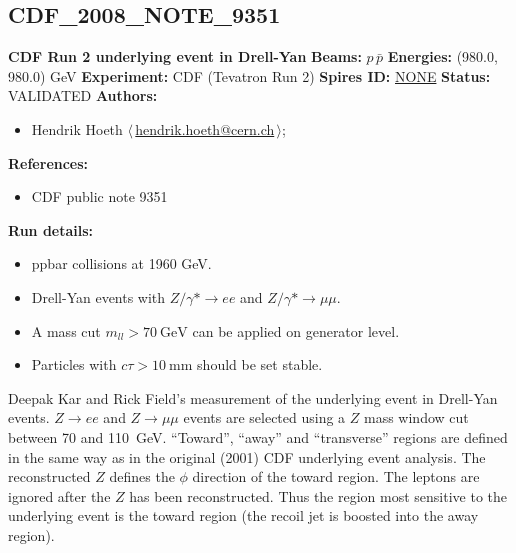 \subsection{CDF\_2008\_NOTE\_9351}
\textbf{CDF Run 2 underlying event in Drell-Yan}\newline
\textbf{Beams:} $p$\,$\bar{p}$ \newline
\textbf{Energies:} (980.0, 980.0) GeV \newline
\textbf{Experiment:} CDF (Tevatron Run 2) \newline
\textbf{Spires ID:} \href{http://www.slac.stanford.edu/spires/find/hep/www?rawcmd=key+NONE}{NONE}\newline
\textbf{Status:} VALIDATED\newline
\textbf{Authors:}
\begin{itemize}
  \item Hendrik Hoeth $\langle\,$\href{mailto:hendrik.hoeth@cern.ch}{hendrik.hoeth@cern.ch}$\,\rangle$;
\end{itemize}
\textbf{References:}
\begin{itemize}
  \item CDF public note 9351
\end{itemize}
\textbf{Run details:}
\begin{itemize}

  \item ppbar collisions at 1960 GeV.
  \item Drell-Yan events with $Z/\gamma* \ensuremath{\to} e e$ and $Z/\gamma* \ensuremath{\to} \mu\mu$.
  \item A mass cut $m_{ll} > 70~\text{GeV}$ can be applied on generator level.
  \item Particles with $c \tau > 10~\text{mm}$ should be set stable.\end{itemize}

\noindent Deepak Kar and Rick Field's measurement of the underlying event in Drell-Yan events. $Z \ensuremath{\to} ee$ and $Z \ensuremath{\to} \mu\mu$ events are selected using a $Z$ mass window cut between 70 and 110~GeV. ``Toward'', ``away'' and ``transverse'' regions are defined in the same way as in the original (2001) CDF underlying event analysis. The reconstructed $Z$ defines the $\phi$ direction of the toward region. The leptons are ignored after the $Z$ has been reconstructed. Thus the region most sensitive to the underlying event is the toward region (the recoil jet is boosted into the away region).

